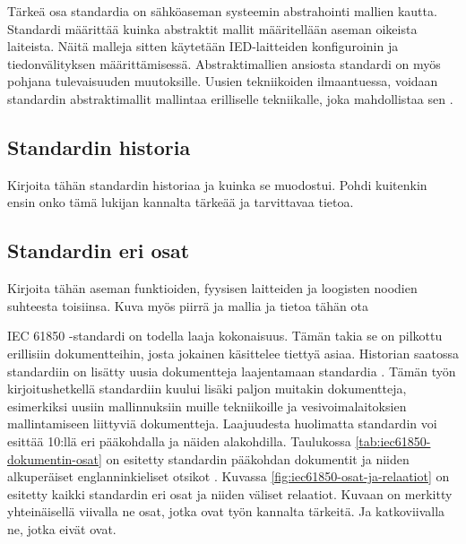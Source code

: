 Tärkeä osa standardia on sähköaseman systeemin abstrahointi mallien kautta. Standardi määrittää kuinka abstraktit mallit määritellään aseman oikeista laiteista. Näitä malleja sitten käytetään IED-laitteiden konfiguroinin ja tiedonvälityksen määrittämisessä. Abstraktimallien ansiosta standardi on myös pohjana tulevaisuuden muutoksille. Uusien tekniikoiden ilmaantuessa, voidaan standardin abstraktimallit mallintaa erilliselle tekniikalle, joka mahdollistaa sen \cite[s.~2]{Brunner2008}.


\subsection{Standardin historia}
\begin{it}
	Kirjoita tähän standardin historiaa ja kuinka se muodostui. Pohdi kuitenkin ensin onko tämä lukijan kannalta tärkeää ja tarvittavaa tietoa.
\end{it}


\subsection{Standardin eri osat}
\begin{it}
	Kirjoita tähän aseman funktioiden, fyysisen laitteiden ja loogisten noodien suhteesta toisiinsa. Kuva myös piirrä ja mallia ja tietoa tähän ota \cite[s.~19]{IEC61850-1}
\end{it}
	
IEC 61850 -standardi on todella laaja kokonaisuus. Tämän takia se on pilkottu erillisiin dokumentteihin, josta jokainen käsittelee tiettyä asiaa. Historian saatossa standardiin on lisätty uusia dokumentteja laajentamaan standardia \cite{IEC61850series, New-documents-by-IEC-TC-57} \cite[s.~13]{IEC61850-1}. Tämän työn kirjoitushetkellä standardiin kuului lisäki paljon muitakin dokumentteja, esimerkiksi uusiin mallinnuksiin muille tekniikoille ja vesivoimalaitoksien mallintamiseen liittyviä dokumentteja. Laajuudesta huolimatta standardin voi esittää 10:llä eri pääkohdalla ja näiden alakohdilla. Taulukossa \ref{tab:iec61850-dokumentin-osat} on esitetty standardin pääkohdan dokumentit ja niiden alkuperäiset englanninkieliset otsikot \cite[s.~2]{Mackiewicz2006} \cite{IEC61850series}. Kuvassa \ref{fig:iec61850-osat-ja-relaatiot} on esitetty kaikki standardin eri osat ja niiden väliset relaatiot. Kuvaan on merkitty yhteinäisellä viivalla ne osat, jotka ovat työn kannalta tärkeitä. Ja katkoviivalla ne, jotka eivät ovat.

